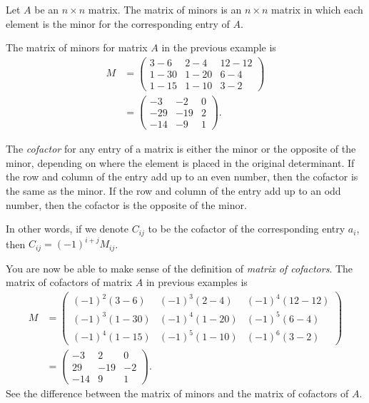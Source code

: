 \documentclass{subfile}
\begin{document}
	\begin{definition}
		Let $A$ be an $n\times n$ matrix. The matrix of minors is an $n\times n$ matrix in which each element is the minor for the corresponding entry of $A$.
	\end{definition}

	\begin{example}
		The matrix of minors for matrix $A$ in the previous example is
		\begin{align*}
			M
				& =
					\begin{pmatrix}
						3-6&2-4&12-12\\1-30&1-20&6-4\\1-15&1-10&3-2
					\end{pmatrix}\\
				& =
					\begin{pmatrix}
						-3&-2&0\\-29&-19&2\\-14&-9&1
					\end{pmatrix}.
		\end{align*}
	\end{example}

	\begin{definition}[Cofactor]
		The \textit{cofactor} for any entry of a matrix is either the minor or the opposite of the minor, depending on where the element is placed in the original determinant. If the row and column of the entry add up to an even number, then the cofactor is the same as the minor. If the row and column of the entry add up to an odd number, then the cofactor is the opposite of the minor.

		In other words, if we denote $C_{ij}$ to be the cofactor of the corresponding entry $a_{i}$, then $C_{ij}=(-1)^{i+j} M_{ij}$.
	\end{definition}

	\begin{example}
		You are now be able to make sense of the definition of \textit{matrix of cofactors}. The matrix of cofactors of matrix $A$ in previous examples is
			\begin{align*}
				M
					& =
					\begin{pmatrix}
						(-1)^{2}(3-6)&(-1)^{3}(2-4)&(-1)^{4}(12-12)\\ 	(-1)^{3}(1-30)&(-1)^{4}(1-20)&(-1)^{5}(6-4)\\ (-1)^{4}(1-15)&(-1)^{5}(1-10)&(-1)^{6}(3-2)
					\end{pmatrix}\\
					& =
					\begin{pmatrix}
						-3&2&0\\29&-19&-2\\-14&9&1
					\end{pmatrix}.
			\end{align*}
		See the difference between the matrix of minors and the matrix of cofactors of $A$.
	\end{example}
\end{document}
